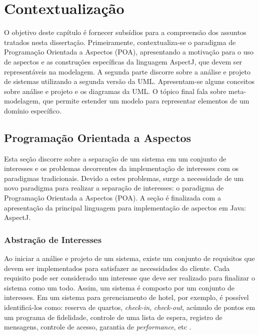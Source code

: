 \chapter{Contextualização}

O objetivo deste capítulo é fornecer subsídios para a compreensão dos assuntos tratados nesta dissertação. Primeiramente, contextualiza-se o paradigma
de Programação Orientada a Aspectos (POA), apresentando a motivação para o uso de aspectos e as construções específicas da linguagem AspectJ, que devem ser representáveis 
na modelagem. A segunda parte discorre sobre a análise e projeto de sistemas utilizando a segunda versão da UML. Apresentam-se alguns conceitos sobre
análise e projeto e os diagramas da UML. O tópico final fala sobre meta-modelagem, que permite estender um modelo para representar elementos de um
domínio específico.

\section{Programação Orientada a Aspectos}

Esta seção discorre sobre a separação de um sistema em um conjunto de interesses e os problemas decorrentes da implementação de interesses com os
paradigmas tradicionais. Devido a estes problemas, surge a necessidade de um novo paradigma para realizar a separação de interesses: o paradigma de
Programação Orientada a Aspectos (POA). A seção é finalizada com a apresentação da principal linguagem para implementação de aspectos em Java: 
AspectJ.

\subsection{Abstração de Interesses}\label{sec:concerns_abstraction}

Ao iniciar a análise e projeto de um sistema, existe um conjunto de requisitos que devem ser implementados para satisfazer as necessidades do cliente.
Cada requisito pode ser considerado um interesse que deve ser realizado para finalizar o sistema como um todo. Assim, um sistema é composto por um
conjunto de interesses. Em um sistema para gerenciamento de hotel, por exemplo, é possível identificá-los como: reserva de quartos, \textit{check-in},
\textit{check-out}, acúmulo de pontos em um programa de fidelidade, controle de uma lista de espera, registro de mensagens, controle de acesso,
garantia de \textit{performance}, etc \cite{Jacobson:2004:ASD:1062430}.

